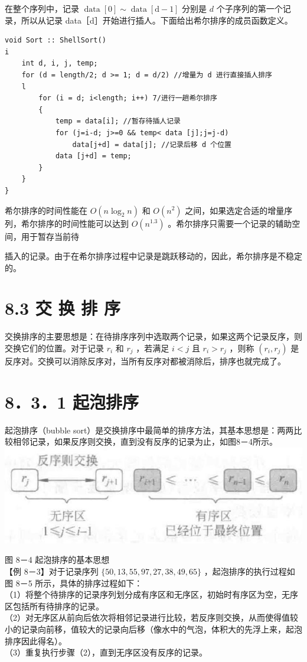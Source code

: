 \documentclass[10pt]{article}
\begin{document}
在整个序列中，记录 $\operatorname{data}[0] \sim \operatorname{data}[\mathrm{d}-1]$ 分别是 $d$ 个子序列的第一个记录，所以从记录 data［d］开始进行插人。下面给出希尔排序的成员函数定义。

\begin{verbatim}
void Sort :: ShellSort()
i
    int d, i, j, temp;
    for (d = length/2; d >= 1; d = d/2) //增量为 d 进行直接插人排序
    l
        for (i = d; i<length; i++) 7/进行一趟希尔排序
        {
            temp = data[i]; //暂存待插人记录
            for (j=i-d; j>=0 && temp< data [j];j=j-d)
                data[j+d] = data[j]; //记录后移 d 个位置
            data [j+d] = temp;
        }
    }
}
\end{verbatim}

希尔排序的时间性能在 $O\left(n \log _{2} n\right)$ 和 $O\left(n^{2}\right)$ 之间，如果选定合适的增量序列，希尔排序的时间性能可以达到 $O\left(n^{1.3}\right)$ 。希尔排序只需要一个记录的辅助空间，用于暂存当前待

插入的记录。由于在希尔排序过程中记录是跳跃移动的，因此，希尔排序是不稳定的。

\section*{8.3 交 换 排 序}
交换排序的主要思想是：在待排序序列中选取两个记录，如果这两个记录反序，则交换它们的位置。对于记录 $r_{i}$ 和 $r_{j}$ ，若满足 $i<j$ 且 $r_{i}>r_{j}$ ，则称 $\left(r_{i}, r_{j}\right)$ 是反序对。交换可以消除反序对，当所有反序对都被消除后，排序也就完成了。

\section*{8．3．1 起泡排序}
起泡排序（bubble sort）是交换排序中最简单的排序方法，其基本思想是：两两比较相邻记录，如果反序则交换，直到没有反序的记录为止，如图8－4所示。\\
\includegraphics[max width=\textwidth, center]{2025_06_06_704745ea57b15b2333e5g-275}

图 8－4 起泡排序的基本思想\\
【例 8－3】对于记录序列 $\{50,13,55,97,27,38,49,65\}$ ，起泡排序的执行过程如图 8－5 所示，具体的排序过程如下：\\
（1）将整个待排序的记录序列划分成有序区和无序区，初始时有序区为空，无序区包括所有待排序的记录。\\
（2）对无序区从前向后依次将相邻记录进行比较，若反序则交换，从而使得值较小的记录向前移，值较大的记录向后移（像水中的气泡，体积大的先浮上来，起泡排序因此得名）。\\
（3）重复执行步骤（2），直到无序区没有反序的记录。
\end{document}
